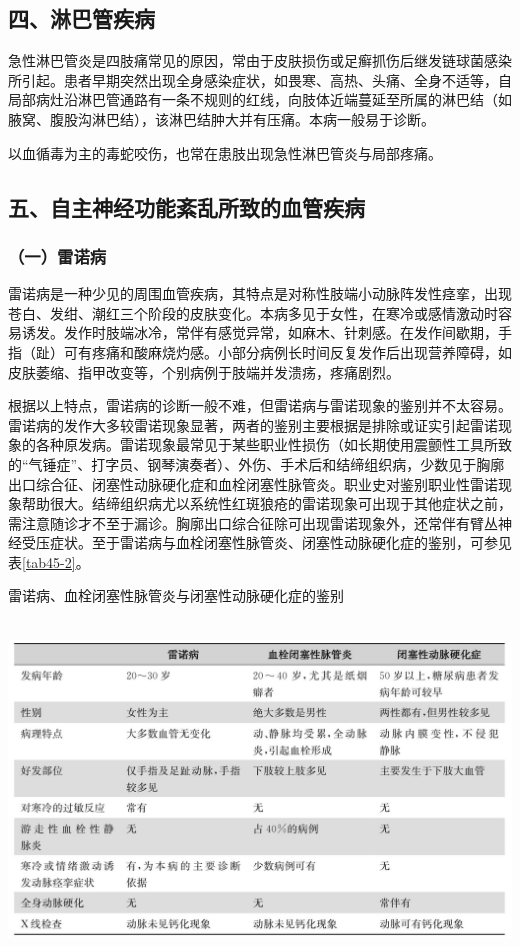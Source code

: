 \subsection{四、淋巴管疾病}

急性淋巴管炎是四肢痛常见的原因，常由于皮肤损伤或足癣抓伤后继发链球菌感染所引起。患者早期突然出现全身感染症状，如畏寒、高热、头痛、全身不适等，自局部病灶沿淋巴管通路有一条不规则的红线，向肢体近端蔓延至所属的淋巴结（如腋窝、腹股沟淋巴结），该淋巴结肿大并有压痛。本病一般易于诊断。

以血循毒为主的毒蛇咬伤，也常在患肢出现急性淋巴管炎与局部疼痛。

\subsection{五、自主神经功能紊乱所致的血管疾病}

\subsubsection{（一）雷诺病}

雷诺病是一种少见的周围血管疾病，其特点是对称性肢端小动脉阵发性痉挛，出现苍白、发绀、潮红三个阶段的皮肤变化。本病多见于女性，在寒冷或感情激动时容易诱发。发作时肢端冰冷，常伴有感觉异常，如麻木、针刺感。在发作间歇期，手指（趾）可有疼痛和酸麻烧灼感。小部分病例长时间反复发作后出现营养障碍，如皮肤萎缩、指甲改变等，个别病例于肢端并发溃疡，疼痛剧烈。

根据以上特点，雷诺病的诊断一般不难，但雷诺病与雷诺现象的鉴别并不太容易。雷诺病的发作大多较雷诺现象显著，两者的鉴别主要根据是排除或证实引起雷诺现象的各种原发病。雷诺现象最常见于某些职业性损伤（如长期使用震颤性工具所致的“气锤症”、打字员、钢琴演奏者）、外伤、手术后和结缔组织病，少数见于胸廓出口综合征、闭塞性动脉硬化症和血栓闭塞性脉管炎。职业史对鉴别职业性雷诺现象帮助很大。结缔组织病尤以系统性红斑狼疮的雷诺现象可出现于其他症状之前，需注意随诊才不至于漏诊。胸廓出口综合征除可出现雷诺现象外，还常伴有臂丛神经受压症状。至于雷诺病与血栓闭塞性脉管炎、闭塞性动脉硬化症的鉴别，可参见表\ref{tab45-2}。

\begin{table}[htbp]
\centering
\caption{雷诺病、血栓闭塞性脉管炎与闭塞性动脉硬化症的鉴别}
\label{tab45-2}
\includegraphics[width=5.97917in,height=3.52083in]{./images/Image00274.jpg}
\end{table}

